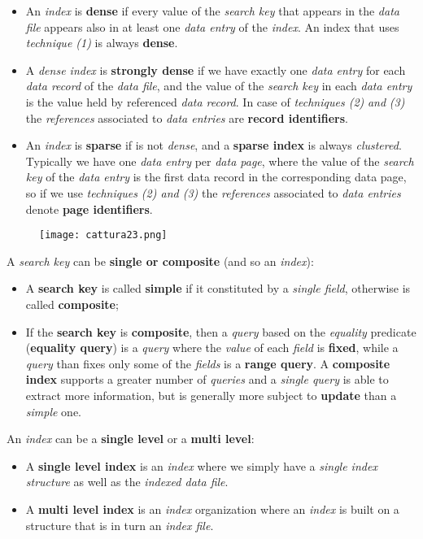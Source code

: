 \documentclass{article}
\begin{document}
\begin{itemize}
\item An \emph{index} is \textbf{dense} if every value of the \emph{search key }that appears in the \emph{data file} appears also in at least one\emph{ data entry} of the \emph{index}. An index that uses \emph{technique (1)} is always \textbf{dense}. 
\item A \emph{dense index} is \textbf{strongly dense} if we have exactly one \emph{data entry} for each \emph{data record} of the \emph{data file}, and the value of the \emph{search key} in each \emph{data entry} is the value held by referenced \emph{data record}. In case of \emph{techniques (2)} \emph{and}\emph{ (3)} the \emph{references} associated to \emph{data entries} are \textbf{record identifiers}. 
\item An \emph{index} is \textbf{sparse} if is not \emph{dense}, and a \textbf{sparse index} is always \emph{clustered}. Typically we have one \emph{data entry} per \emph{data page}, where the value of the \emph{search key} of the \emph{data entry} is the first data record in the corresponding data page, so if we use \emph{techniques (2) and (3)} the \emph{references} associated to \emph{data entries} denote \textbf{page identifiers}.
\end{itemize}
\begin{figure}[H]
  \centering
  \texttt{[image: cattura23.png]}
\end{figure}
A \emph{search key} can be \textbf{single or composite} (and so an \emph{index}):
\begin{itemize}
\item A \textbf{search key} is called \textbf{simple} if it constituted by a \emph{single field}, otherwise is called \textbf{composite};
\item If the \textbf{search key} is \textbf{composite}, then a \emph{query} based on the \emph{equality} predicate (\textbf{equality query}) is a \emph{query} where the \emph{value} of each \emph{field} is \textbf{fixed}, while a \emph{query} than fixes only some of the \emph{fields} is a \textbf{range query}. A \textbf{composite index} supports a greater number of \emph{queries} and a \emph{single query} is able to extract more information, but is generally more subject to \textbf{update} than a \emph{simple} one. 
\end{itemize}
An \emph{index} can be a \textbf{single level} or a \textbf{multi level}:
\begin{itemize}
\item A \textbf{single level index} is an \emph{index} where we simply have a \emph{single index structure} as well as the \emph{indexed data file}.
\item A \textbf{multi level index} is an \emph{index} organization where an \emph{index} is built on a structure that is in turn an \emph{index file}. 
\end{itemize}
\end{document}
